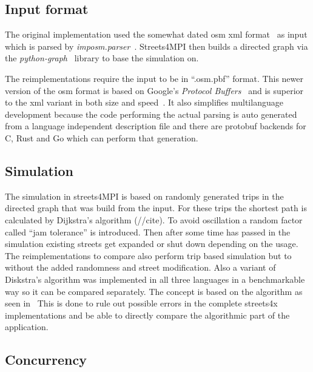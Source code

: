 \subsection*{Input format}
\label{subsec:Approach::Differences::Input}

The original implementation used the somewhat dated \gls{osm} \gls{xml} format~ as input which is parsed by \textit{imposm.parser}~. Streets4MPI then builds a directed graph via the \textit{python-graph}~ library to base the simulation on.\cite{streets_report}

The reimplementations require the input to be in ``.osm.pbf'' format. This newer version of the \gls{osm} format is based on Google's \textit{Protocol Buffers}~ and is superior to the \gls{xml} variant in both size and speed~\cite{osm_wiki_pbf}. It also simplifies multilanguage development because the code performing the actual parsing is auto generated from a language independent description file and there are protobuf backends for C, Rust and Go which can perform that generation.

\subsection*{Simulation}
\label{subsec:Approach::Differences::Simulation}

The simulation in streets4MPI is based on randomly generated trips in the directed graph that was build from the input. For these trips the shortest path is calculated by Dijkstra's algorithm (//cite). To avoid oscillation a random factor called ``jam tolerance'' is introduced. Then after some time has passed in the simulation existing streets get expanded or shut down depending on the usage. The reimplementations to compare also perform trip based simulation but to without the added randomness and street modification. Also a variant of Diskstra's algorithm was implemented in all three languages in a benchmarkable way so it can be compared separately. The concept is based on the  algorithm as seen in~\cite[p. 16]{dijkstra_utcs} This is done to rule out possible errors in the complete streets4x implementations and be able to directly compare the algorithmic part of the application.

\subsection*{Concurrency}
\label{subsec:Approach::Differences::Concurrency}

